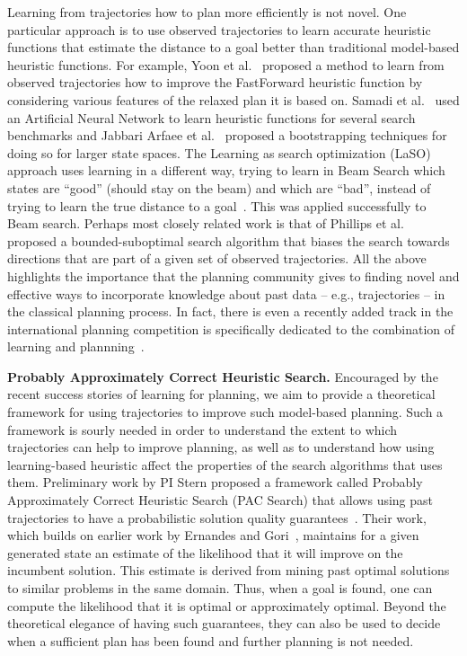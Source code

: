 \documentclass[12pt]{article}
\begin{document}
Learning from trajectories how to plan more efficiently is not novel. 
One particular approach is to use observed trajectories to learn accurate heuristic functions that estimate the distance to a goal better than traditional model-based heuristic functions. For example, Yoon et al.~\cite{yoon2006learning} proposed a method to learn from observed trajectories how to improve the FastForward heuristic function by considering various features of the relaxed plan it is based on. 
Samadi et al.~\cite{samadi2008learning} used an Artificial Neural Network to learn heuristic functions for several search benchmarks and Jabbari Arfaee et al.~\cite{arfaee2011learning} proposed a bootstrapping techniques for doing so for larger state spaces. The Learning as search optimization (LaSO) approach uses learning in a different way, trying to learn in Beam Search which states are ``good'' (should stay on the beam) and which are ``bad'', instead of trying to learn the true distance to a goal~\cite{xu2007discriminative}. This was applied successfully to Beam search. Perhaps most closely related work is that of Phillips et al.~\cite{phillips2012graphs} proposed a bounded-suboptimal search algorithm that biases the search towards directions that are part of a given set of observed trajectories. All the above highlights the importance that the planning community gives to  finding novel and effective ways to incorporate knowledge about past data -- e.g., trajectories -- in the classical planning process. In fact, there is even a recently added track in the international planning competition is specifically dedicated to the combination of learning and plannning~\cite{fern2011first}. 





{\bf Probably Approximately Correct Heuristic Search.} 
Encouraged by the recent success stories of learning for planning, we aim to provide a theoretical framework for using trajectories to improve such model-based planning. Such a framework is sourly needed in order to understand the extent to which trajectories can help to improve planning, as well as to understand how using learning-based heuristic affect the properties of the search algorithms that uses them. Preliminary work by PI Stern proposed a framework called Probably Approximately Correct Heuristic Search (PAC Search) that allows using past trajectories to have a probabilistic solution quality guarantees~\cite{stern2011probably,stern2012search}. Their work, which builds on earlier work by Ernandes and Gori~\cite{ernandes2004likely}, maintains for a given generated state an estimate of the likelihood that it will improve on the incumbent solution. This estimate is derived from mining past optimal solutions to similar problems in the same domain. Thus, when a goal is found, one can compute the likelihood that it is optimal or approximately optimal. Beyond the theoretical elegance of having such guarantees, they can also be used to decide when a sufficient plan has been found and further planning is not needed. 
\end{document}
